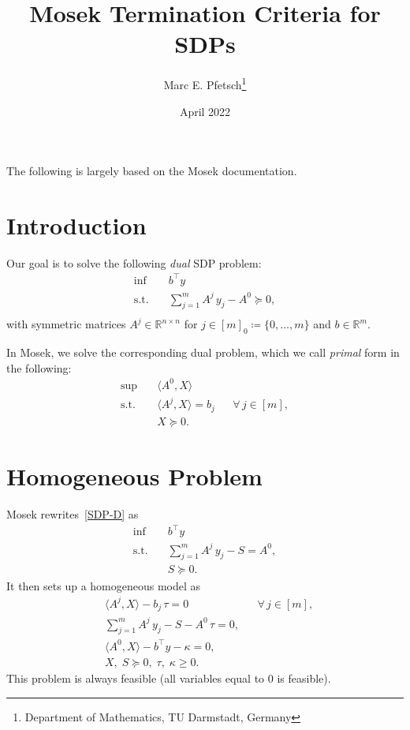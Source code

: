 \documentclass[10pt, a4paper]{article}
\title{Mosek Termination Criteria for SDPs}
\author{Marc E. Pfetsch\thanks{Department of Mathematics, TU Darmstadt, Germany}}
\date{April 2022}
\newcommand{\define}{\coloneqq}
\newcommand{\skal}[2]{\langle{#1},{#2}\rangle}
\newcommand{\T}{^{\top}}
\newcommand{\R}{\mathds{R}}
\begin{document}
\maketitle

\noindent
The following is largely based on the Mosek documentation.

\section{Introduction}

Our goal is to solve the following \emph{dual} SDP problem:
\begin{equation}\label{SDP-D}
  \begin{aligned}
    \inf \quad & b\T y \\
    \text{s.t.} \quad & \sum_{j=1}^m A^j\, y_j - A^0 \succeq 0, \\
  \end{aligned}
\end{equation}
with symmetric matrices $A^j \in \R^{n \times n}$ for
$j \in [m]_0 \define \{0, \dots, m\}$ and $b \in \R^m$.

In Mosek, we solve the corresponding dual problem, which we call \emph{primal}
form in the following:
\begin{equation}\label{SDP-P}
  \begin{aligned}
     \sup \quad & \skal{A^0}{X} \\
     \mbox{s.t.} \quad & \skal{A^j}{X} = b_j && \forall \, j \in [m],\\
     & X \succeq 0.
  \end{aligned}
\end{equation}

\section{Homogeneous Problem}

Mosek rewrites~\eqref{SDP-D} as
\begin{equation}\label{SDP-D2}
  \begin{aligned}
    \inf \quad & b\T y \\
    \text{s.t.} \quad & \sum_{j=1}^m A^j\, y_j - S = A^0, \\
    & S \succeq 0.
  \end{aligned}
\end{equation}
It then sets up a homogeneous model as
\begin{equation}\label{HOM}
  \begin{aligned}
    & \skal{A^j}{X} - b_j\,\tau = 0 && \forall \, j \in [m],\\
    & \sum_{j=1}^m A^j\, y_j - S - A^0\, \tau = 0, \\
    & \skal{A^0}{X} - b\T y - \kappa = 0,\\
    & X,\; S \succeq 0,\; \tau,\; \kappa \geq 0.
  \end{aligned}
\end{equation}
This problem is always feasible (all variables equal to 0 is feasible).
\end{document}
